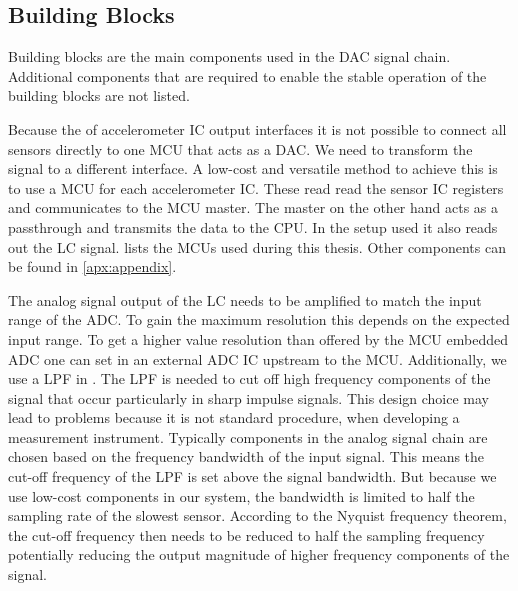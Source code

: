 \subsection{Building Blocks}

Building blocks are the main components used in the \ac{DAC} signal chain. Additional components that are required to enable the stable operation of the building blocks are not listed.

Because the of accelerometer \ac{IC} output interfaces it is not possible to connect all sensors directly to one \ac{MCU} that acts as a \ac{DAC}. We need to transform the signal to a different interface. A low-cost and versatile method to achieve this is to use a \ac{MCU} for each accelerometer \ac{IC}. These read read the sensor \ac{IC} registers and communicates to the \ac{MCU} master. The master on the other hand acts as a passthrough and transmits the data to the \ac{CPU}. In the setup used it also reads out the \ac{LC} signal.  lists the \ac{MCU}s used during this thesis. Other components can be found in \autoref{apx:appendix}.

The analog signal output of the \ac{LC} needs to be amplified to match the input range of the \ac{ADC}. To gain the maximum resolution this depends on the expected input range. To get a higher value resolution than offered by the \ac{MCU} embedded \ac{ADC} one can set in an external \ac{ADC} \ac{IC} upstream to the \ac{MCU}. Additionally, we use a \ac{LPF} in . The \ac{LPF} is needed to cut off high frequency components of the signal that occur particularly in sharp impulse signals. This design choice may lead to problems because it is not standard procedure, when developing a measurement instrument. Typically components in the analog signal chain are chosen based on the frequency bandwidth of the input signal. This means the cut-off frequency of the \ac{LPF} is set above the signal bandwidth. But because we use low-cost components in our system, the bandwidth is limited to half the sampling rate of the slowest sensor. According to the Nyquist frequency theorem, the cut-off frequency then needs to be reduced to half the sampling frequency potentially reducing the output magnitude of higher frequency components of the signal.

